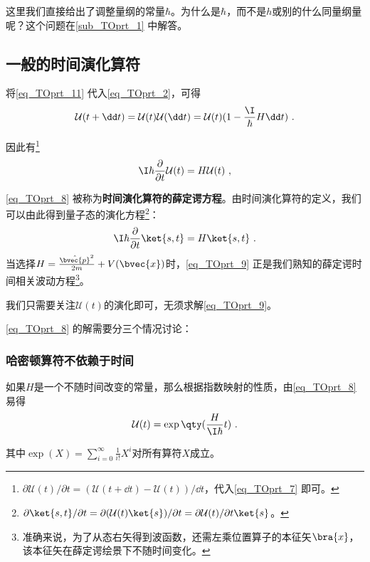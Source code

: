 这里我们直接给出了调整量纲的常量$\hbar$。为什么是$\hbar$，而不是$h$或别的什么同量纲量呢？这个问题在\autoref{sub_TOprt_1} 中解答。



\subsection{一般的时间演化算符}

将\autoref{eq_TOprt_11} 代入\autoref{eq_TOprt_2}，可得
\begin{equation}\label{eq_TOprt_7}
\mathcal{U}(t+\dd t) = \mathcal{U}(t)\mathcal{U}(\dd t) = \mathcal{U}(t)(1-\frac{\I}{\hbar}H \dd t)~.
\end{equation}

因此有\footnote{$\partial\mathcal{U}(t)/\partial t=(\mathcal{U}(t+\dd t)-\mathcal{U}(t))/\dd t$，代入\autoref{eq_TOprt_7} 即可。}
\begin{equation}\label{eq_TOprt_8}
\I\hbar\frac{\partial}{\partial t}\mathcal{U}(t) = H\mathcal{U}(t)~,
\end{equation}


\autoref{eq_TOprt_8} 被称为\textbf{时间演化算符的薛定谔方程}。由时间演化算符的定义，我们可以由此得到量子态的演化方程\footnote{$\partial\ket{s, t}/\partial t=\partial(\mathcal{U}(t)\ket{s})/\partial t=\partial \mathcal{U}(t)/\partial t \ket{s}$。}：
\begin{equation}\label{eq_TOprt_9}
\I\hbar\frac{\partial}{\partial t}\ket{s, t} = H\ket{s, t}~.
\end{equation}
当选择$H=\frac{\hat{\bvec{p}}^2}{2m}+V(\bvec{x})$时，\autoref{eq_TOprt_9} 正是我们熟知的薛定谔时间相关波动方程\footnote{准确来说，为了从态右矢得到波函数，还需左乘位置算子的本征矢$\bra{x}$，该本征矢在薛定谔绘景下不随时间变化。}。


我们只需要关注$\mathcal{U}(t)$的演化即可，无须求解\autoref{eq_TOprt_9}。

\autoref{eq_TOprt_8} 的解需要分三个情况讨论：


\subsubsection{哈密顿算符不依赖于时间}

如果$H$是一个不随时间改变的常量，那么根据指数映射的性质，由\autoref{eq_TOprt_8} 易得
\begin{equation}
\mathcal{U}(t) = \exp\qty(\frac{H}{\I \hbar}t)~.
\end{equation}

其中$\exp(X)=\sum_{i=0}^\infty \frac{1}{i!}X^i$对所有算符$X$成立。



